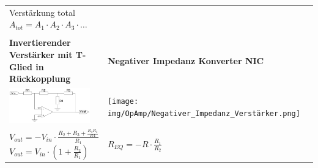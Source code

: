 \documentclass[margin=normal]{tex/hsrzf}
\begin{document}
\begin{tabularx}{0.8\textwidth}{p{155pt}p{155pt}p{155pt}}
  Verstärkung total $ A_{tot} = A_1 \cdot A_2 \cdot A_3\cdot\dots$                                    \\
  \\
  \textbf{Invertierender Verstärker \newline
  mit T-Glied in Rückkopplung}                                                                      &
  \textbf{Negativer Impedanz Konverter NIC}                                                           \\
  \includegraphics[width = 3.5cm]{img/OpAmp/Invertierender_Verstärker_mit_T-Glied_Rückkopplung.png} &
  \texttt{[image: img/OpAmp/Negativer\_Impedanz\_Verstärker.png]}                        \\
  $ V_{out} = - V_{in} \cdot \frac{R_2 + R_3 + \frac{R_2R_3}{R4}}{R_1} $
  \newline
  $ V_{out} = V_{in} \cdot (1+ \frac{R_2}{R_1})$                                                    &
  $R_{EQ} = -R \cdot \frac{R_1}{R_2}$
  \\
\end{tabularx}
\endgroup
\end{document}
